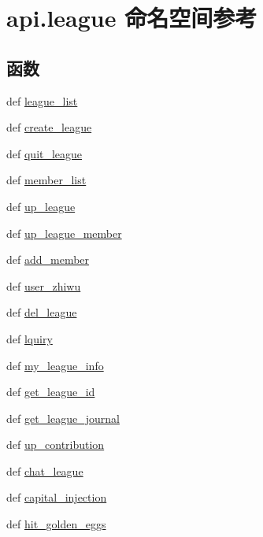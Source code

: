 \hypertarget{namespaceapi_1_1league}{\section{api.\-league 命名空间参考}
\label{namespaceapi_1_1league}
}
\subsection*{函数}
\begin{DoxyCompactItemize}
\item 
def \hyperlink{namespaceapi_1_1league_a4d19b76a3c9374bf2946a0740bc88f32}{league\-\_\-list}
\item 
def \hyperlink{namespaceapi_1_1league_a340bc39a431fcc21b50dcf7f9269cce9}{create\-\_\-league}
\item 
def \hyperlink{namespaceapi_1_1league_a7f753935ab3616b590b3ba02014a1d7a}{quit\-\_\-league}
\item 
def \hyperlink{namespaceapi_1_1league_a965f166d2eaf9ef318e0403feaea99f8}{member\-\_\-list}
\item 
def \hyperlink{namespaceapi_1_1league_aa92ddf01ec934e4232f76993334848f2}{up\-\_\-league}
\item 
def \hyperlink{namespaceapi_1_1league_a8a5832f8b895b670173703e3fc77974d}{up\-\_\-league\-\_\-member}
\item 
def \hyperlink{namespaceapi_1_1league_ab0a3df5e98457266dec9c66b60d9b117}{add\-\_\-member}
\item 
def \hyperlink{namespaceapi_1_1league_ac232afd11c08329dcf553f240c2108a7}{user\-\_\-zhiwu}
\item 
def \hyperlink{namespaceapi_1_1league_ac688b6e26c0b1244baa4019139faf44b}{del\-\_\-league}
\item 
def \hyperlink{namespaceapi_1_1league_a3a7025a95cc5de69bb7b9a1511d3911f}{lquiry}
\item 
def \hyperlink{namespaceapi_1_1league_ae6c1b04c62a9f6b63fd1ef69a4cb24fa}{my\-\_\-league\-\_\-info}
\item 
def \hyperlink{namespaceapi_1_1league_a2fe33b41b37e1c7534c5ad97cbbeea34}{get\-\_\-league\-\_\-id}
\item 
def \hyperlink{namespaceapi_1_1league_ab62dc98ba47fa2d8218002e5a0d712fb}{get\-\_\-league\-\_\-journal}
\item 
def \hyperlink{namespaceapi_1_1league_a7dafa507e3299add0b5731391113157f}{up\-\_\-contribution}
\item 
def \hyperlink{namespaceapi_1_1league_acbbc943ae9362c708c82c8970e43b8ab}{chat\-\_\-league}
\item 
def \hyperlink{namespaceapi_1_1league_a85c01bc0628ec5b5467dae5b6b0df0e0}{capital\-\_\-injection}
\item 
def \hyperlink{namespaceapi_1_1league_a5b1875c6ce4d851bd62dd4f46516e9e9}{hit\-\_\-golden\-\_\-eggs}
\end{DoxyCompactItemize}
